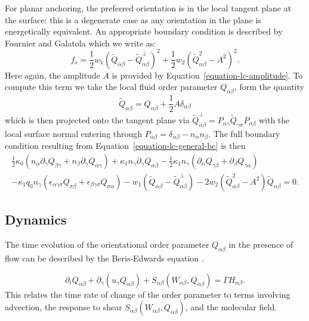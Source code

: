 For planar anchoring, the preferred orientation is in the local tangent
plane at the surface: this is a degenerate case as any orientation in
the plane is energetically equivalent. An appropriate boundary
condition is described by Fournier and Galatola \cite{fournier2005}
which we write as:
\begin{equation}
f_s =
{\textstyle\frac{1}{2}} w_1 (\tilde{Q}_{\alpha\beta} - \tilde{Q}^\perp_{\alpha\beta})^2
+ {\textstyle\frac{1}{2}} w_2 (\tilde{Q}_{\alpha\beta}^2 - A^2)^2.
\end{equation}
Here again, the amplitude $A$ is provided by
Equation~\ref{equation-lc-amplitude}. To compute this term we take
the local fluid order parameter $Q_{\alpha\beta}$, form the quantity
$$
\tilde{Q}_{\alpha\beta}
= Q_{\alpha\beta} + {\textstyle \frac{1}{2}A\delta_{\alpha\beta} }
$$
which is then projected onto the tangent plane via
$
\tilde{Q}^\perp_{\alpha\beta}
= P_{\alpha\gamma} \tilde{Q}_{\gamma\sigma} P_{\sigma\beta}
$
with the local surface normal entering through
$P_{\alpha\beta} = \delta_{\alpha\beta} - n_\alpha n_\beta$.
The full boundary condition resulting from
Equation~\ref{equation-lc-general-bc} is then
\begin{eqnarray}
{\textstyle\frac{1}{2}} \kappa_0 (n_\alpha \partial_\gamma Q_{\beta\gamma}
+ n_\beta \partial_\gamma Q_{\alpha\gamma})
+ \kappa_1 n_\gamma \partial_\gamma Q_{\alpha\beta}
- {\textstyle\frac{1}{2}} \kappa_1 n_\gamma ( \partial_\alpha Q_{\gamma\beta}
+ \partial_\beta Q_{\gamma\alpha})
\nonumber
\\
- \kappa_1 q_0 n_\gamma (\epsilon_{\alpha\gamma\sigma} Q_{\sigma\beta}
+ \epsilon_{\beta\gamma\sigma}Q_{\sigma\alpha})
- w_1 (\tilde{Q}_{\alpha\beta} - \tilde{Q}_{\alpha\beta}^\perp)
- 2w_2(\tilde{Q}_{\alpha\beta}^2 - A^2)\tilde{Q}_{\alpha\beta} = 0.
\label{equation-lc-bc-planar}
\end{eqnarray}



\subsection{Dynamics}

The time evolution of the orientational order parameter $Q_{\alpha\beta}$
in the presence of flow can be described by the Beris-Edwards equation
\cite{beris-edwards}.

\begin{equation}
\partial_t Q_{\alpha\beta} + \partial_\gamma (u_\gamma Q_{\alpha\beta})
+ S_{\alpha\beta}(W_{\alpha\beta}, Q_{\alpha\beta}) = \Gamma  H_{\alpha\beta}.
\label{equation-lc-beris-edwards}
\end{equation}
This relates the time rate of change of the order parameter to terms
involving advection, the response to shear
$S_{\alpha\beta}(W_{\alpha\beta},Q_{\alpha\beta})$, and the molecular
field.

